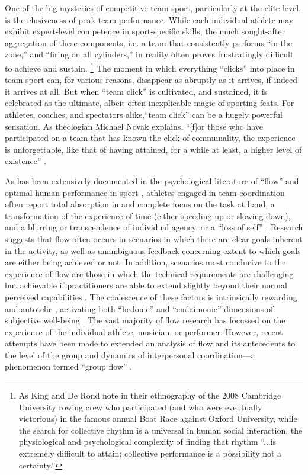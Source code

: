One of the big mysteries of competitive team sport, particularly at the elite level, is the elusiveness of peak team performance.  While each individual athlete may exhibit expert-level competence in sport-specific skills, the much sought-after aggregation of these components, i.e. a team that consistently performs ``in the zone,'' and ``firing on all cylinders,'' in reality often proves frustratingly difficult to achieve and sustain.  \footnote{As King and De Rond \textcite[568]{King2011} note in their ethnography of the 2008 Cambridge University rowing crew who participated (and who were eventually victorious) in the famous annual Boat Race against Oxford University, while the search for collective rhythm is a universal in human social interaction, the physiological and psychological complexity of finding that rhythm ``...is extremely difficult to attain; collective performance is a possibility not a certainty.''}   The moment in which everything ``clicks'' into place in team sport can, for various reasons, disappear as abruptly as it arrives, if indeed it arrives at all.
But when ``team click'' is cultivated, and sustained, it is celebrated as the ultimate, albeit often inexplicable magic of sporting feats.  For athletes, coaches, and spectators alike,``team click'' can be a hugely powerful sensation. As theologian Michael Novak explains, ``[f]or those who have participated on a team that has known the click of communality, the experience is unforgettable, like that of having attained, for a while at least, a higher level of existence'' \citep[11]{White2011}.

As has been extensively documented in the psychological literature of ``flow'' \citep{Csikszentmihalyi1992} and optimal human performance in sport \citep{Jackson1999}, athletes engaged in team coordination often report total absorption in and complete focus on the task at hand, a transformation of the experience of time (either speeding up or slowing down), and a blurring or transcendence of individual agency, or a ``loss of self''   \citep{Csikszentmihalyi1992,Jackson1995,Jackson1999,McNeill1995}.  Research suggests that flow often occurs in scenarios in which there are clear goals inherent in the activity, as well as unambiguous feedback concerning extent to which goals are either being achieved or not.
In addition, scenarios most conducive to the experience of flow are those in which the technical requirements are challenging but achievable if practitioners are able to extend slightly beyond their normal perceived capabilities \citep{Fong2015}.
The coalescence of these factors is intrinsically rewarding and autotelic \citep{Csikszentmihalyi1975}, activating both ``hedonic'' and ``eudaimonic'' dimensions of subjective well-being \citep{Huta2010,Fave2009}.  The vast majority of flow research has focussed on the experience of the individual athlete, musician, or performer.  However, recent attempts have been made to extended an analysis of flow and its antecedents to the level of the group and dynamics of interpersonal coordination---a phenomenon termed ``group flow'' \citep{Sawyer2006}.

